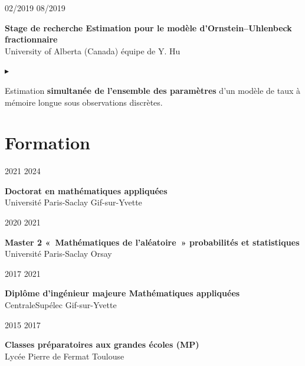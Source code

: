 \documentclass[10pt,a4paper]{article}
\newlength{\datecol}\setlength{\datecol}{0.165\textwidth}
\newlength{\gutter}\setlength{\gutter}{1em}
\newlength{\bodycol}
\newcommand{\entry}[3]{%
  \par\vspace{1.0ex plus 0.9ex minus 0.1ex}\noindent
  \begin{minipage}[t]{\datecol}
    \vspace{0pt}\raggedright\small\color{muted}#1
  \end{minipage}%
  \hspace{\gutter}%
  \begin{minipage}[t]{\bodycol}
    \vspace{0pt}\raggedright
    {\headingfont\bfseries\small #2}\\[0.15ex]
    {\small\color{accent}#3}
  \end{minipage}%
  \par\vspace{0.3ex}
}
\newenvironment{bullets}
  {\begin{list}{\textcolor{accent}{\scriptsize$\blacktriangleright$}}{%
      \setlength{\leftmargin}{\datecol}
      \addtolength{\leftmargin}{\gutter}
      \addtolength{\leftmargin}{1.25em}
      \setlength{\rightmargin}{0pt}
      \setlength{\labelwidth}{0.9em}
      \setlength{\labelsep}{0.35em}
      \setlength{\itemsep}{0.2ex}
      \setlength{\parsep}{0pt}
      \setlength{\topsep}{0.4ex}
      \setlength{\partopsep}{0pt}
      \small}}
  {\end{list}}
\begin{document}
\entry{02/2019 \textemdash{} 08/2019}{Stage de recherche \textemdash{} Estimation pour le modèle d'Ornstein--Uhlenbeck fractionnaire}{University of Alberta (Canada) \textemdash{} équipe de Y. Hu}
\begin{bullets}
  \item Estimation \textbf{simultanée de l'ensemble des paramètres} d'un modèle de taux à mémoire longue sous
  observations discrètes.
\end{bullets}

\section{Formation}

\entry{2021 \textemdash{} 2024}{Doctorat en mathématiques appliquées}{Université Paris-Saclay \textemdash{} Gif-sur-Yvette}

\entry{2020 \textemdash{} 2021}{Master 2 «~Mathématiques de l'aléatoire~» \textemdash{} probabilités et statistiques}{Université Paris-Saclay \textemdash{} Orsay}

\entry{2017 \textemdash{} 2021}{Diplôme d'ingénieur \textemdash{} majeure Mathématiques appliquées}{CentraleSupélec \textemdash{} Gif-sur-Yvette}

\entry{2015 \textemdash{} 2017}{Classes préparatoires aux grandes écoles (MP)}{Lycée Pierre de Fermat \textemdash{} Toulouse}

\end{document}
